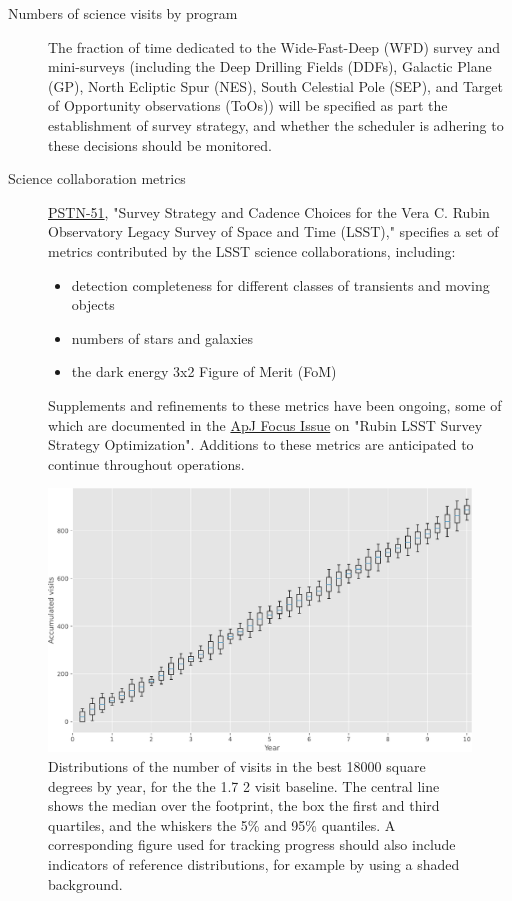 \begin{description}
\item[{Numbers of science visits by program}] The fraction of time dedicated to the Wide-Fast-Deep (WFD) survey and mini-surveys (including the Deep Drilling Fields (DDFs), Galactic Plane (GP), North Ecliptic Spur (NES), South Celestial Pole (SEP), and Target of Opportunity observations (ToOs)) will be specified as part the establishment of survey strategy, and whether the scheduler is adhering to these decisions should be monitored.
\item[{Science collaboration metrics}] \href{https://ls.st/pstn-051}{PSTN-51}, "Survey Strategy and Cadence Choices for the Vera C. Rubin Observatory Legacy Survey of Space and Time (LSST)," specifies a set of metrics contributed by the LSST science collaborations, including:
\begin{itemize}
\item detection completeness for different classes of transients and moving objects
\item numbers of stars and galaxies
\item the dark energy 3x2 Figure of Merit (FoM)
\end{itemize}
Supplements and refinements to these metrics have been ongoing, some of which are documented in the \href{https://iopscience.iop.org/journal/0067-0049/page/rubin_cadence}{ApJ Focus Issue} on "Rubin LSST Survey Strategy Optimization". Additions to these metrics are anticipated to continue throughout operations. 
\end{description}

\begin{figure}[htbp]
\centering
\includegraphics[width=.9\linewidth]{./figures/numvisits_boxplot.pdf}
\caption{\label{fig:org183acf0}Distributions of the number of visits in the best 18000 square degrees by year, for the the 1.7 2 visit baseline. The central line shows the median over the footprint, the box the first and third quartiles, and the whiskers the 5\% and 95\% quantiles. A corresponding figure used for tracking progress should also include indicators of reference distributions, for example by using a shaded background.}
\end{figure}

